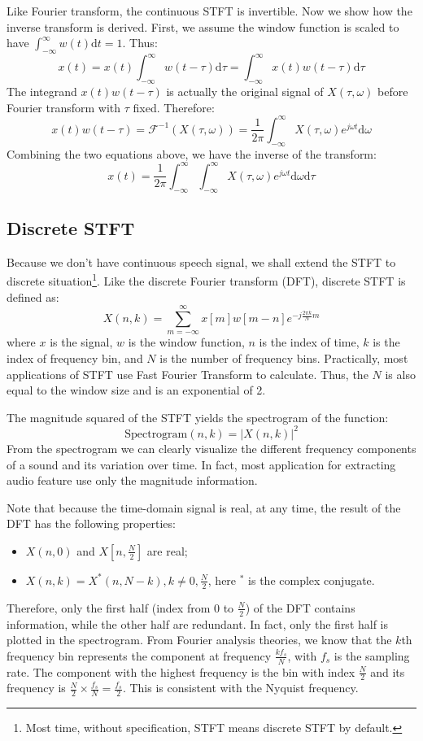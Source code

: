 \documentclass[12pt,final,twoside]{report}
\theoremstyle{plain}
\theoremstyle{definition}
\theoremstyle{remark}
\begin{document}
Like Fourier transform, the continuous STFT is invertible. Now we show how the inverse transform is derived. First, we assume the window function is scaled to have $\int_{-\infty}^{\infty} w(t) \mathrm{d}t = 1$. Thus:
\[
  x(t) = x(t) \int_{-\infty}^{\infty} w(t-\tau) \mathrm{d}\tau = \int_{-\infty}^{\infty} x(t)w(t-\tau) \mathrm{d}\tau
\]
The integrand $x(t)w(t-\tau)$ is actually the original signal of $X(\tau, \omega)$ before Fourier transform with $\tau$ fixed. Therefore:
\[ x(t)w(t-\tau) = \mathcal{F}^{-1}(X(\tau, \omega)) = \frac{1}{2\pi} \int_{-\infty}^{\infty} X(\tau, \omega) e^{j\omega t} \mathrm{d}\omega \]
Combining the two equations above, we have the inverse of the transform:
\[ x(t) = \frac{1}{2\pi} \int_{-\infty}^{\infty} \int_{-\infty}^{\infty} X(\tau, \omega) e^{j\omega t} \mathrm{d}\omega \mathrm{d}\tau \]

\subsection{Discrete STFT}
Because we don't have continuous speech signal, we shall extend the STFT to discrete situation\footnote{Most time, without specification, STFT means discrete STFT by default.}. Like the discrete Fourier transform (DFT), discrete STFT is defined as:
\[ X(n, k) = \sum_{m = -\infty}^{\infty} x[m]w[m-n]e^{-j \frac{2\pi k}{N} m} \]
where $x$ is the signal, $w$ is the window function, $n$ is the index of time, $k$ is the index of frequency bin, and $N$ is the number of frequency bins. Practically, most applications of STFT use Fast Fourier Transform to calculate. Thus, the $N$ is also equal to the window size and is an exponential of 2.

The magnitude squared of the STFT yields the spectrogram of the function:
\[ \text{Spectrogram}(n, k) = \left|X(n,k)\right|^2 \]
From the spectrogram we can clearly visualize the different frequency components of a sound and its variation over time. In fact, most application for extracting audio feature use only the magnitude information.

Note that because the time-domain signal is real, at any time, the result of the DFT has the following properties:
\begin{itemize}
  \item $X(n,0)$ and $X[n, \frac{N}{2}]$ are real;
  \item $X(n,k) = X^*(n,N-k), k \neq 0, \frac{N}{2}$, here $^*$ is the complex conjugate.
\end{itemize}
Therefore, only the first half (index from $0$ to $\frac{N}{2}$) of the DFT contains information, while the other half are redundant. In fact, only the first half is plotted in the spectrogram. From Fourier analysis theories, we know that the $k$th frequency bin represents the component at frequency $\frac{kf_s}{N}$, with $f_s$ is the sampling rate. The component with the highest frequency is the bin with index $\frac{N}{2}$ and its frequency is $\frac{N}{2} \times \frac{f_s}{N} = \frac{f_s}{2}$. This is consistent with the Nyquist frequency.
\end{document}
